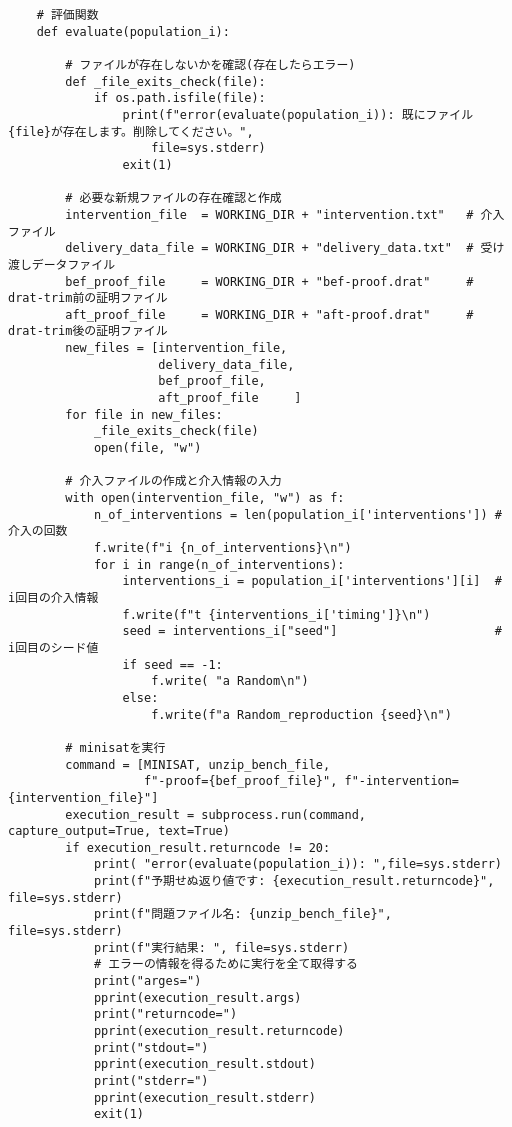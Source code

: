 \begin{lstlisting}
    # 評価関数
    def evaluate(population_i):

        # ファイルが存在しないかを確認(存在したらエラー)
        def _file_exits_check(file):
            if os.path.isfile(file):
                print(f"error(evaluate(population_i)): 既にファイル{file}が存在します。削除してください。",
                    file=sys.stderr)
                exit(1)

        # 必要な新規ファイルの存在確認と作成
        intervention_file  = WORKING_DIR + "intervention.txt"   # 介入ファイル
        delivery_data_file = WORKING_DIR + "delivery_data.txt"  # 受け渡しデータファイル
        bef_proof_file     = WORKING_DIR + "bef-proof.drat"     # drat-trim前の証明ファイル
        aft_proof_file     = WORKING_DIR + "aft-proof.drat"     # drat-trim後の証明ファイル
        new_files = [intervention_file,
                     delivery_data_file,
                     bef_proof_file,
                     aft_proof_file     ]
        for file in new_files:
            _file_exits_check(file)
            open(file, "w")
    
        # 介入ファイルの作成と介入情報の入力
        with open(intervention_file, "w") as f:
            n_of_interventions = len(population_i['interventions']) # 介入の回数
            f.write(f"i {n_of_interventions}\n")
            for i in range(n_of_interventions):
                interventions_i = population_i['interventions'][i]  # i回目の介入情報
                f.write(f"t {interventions_i['timing']}\n")
                seed = interventions_i["seed"]                      # i回目のシード値
                if seed == -1:
                    f.write( "a Random\n")
                else:
                    f.write(f"a Random_reproduction {seed}\n")
    
        # minisatを実行
        command = [MINISAT, unzip_bench_file,
                   f"-proof={bef_proof_file}", f"-intervention={intervention_file}"]
        execution_result = subprocess.run(command, capture_output=True, text=True)
        if execution_result.returncode != 20:
            print( "error(evaluate(population_i)): ",file=sys.stderr)
            print(f"予期せぬ返り値です: {execution_result.returncode}", file=sys.stderr)
            print(f"問題ファイル名: {unzip_bench_file}", file=sys.stderr)
            print(f"実行結果: ", file=sys.stderr)
            # エラーの情報を得るために実行を全て取得する
            print("arges=")
            pprint(execution_result.args)
            print("returncode=")
            pprint(execution_result.returncode)
            print("stdout=")
            pprint(execution_result.stdout)
            print("stderr=")
            pprint(execution_result.stderr)
            exit(1)
       

\end{lstlisting}
